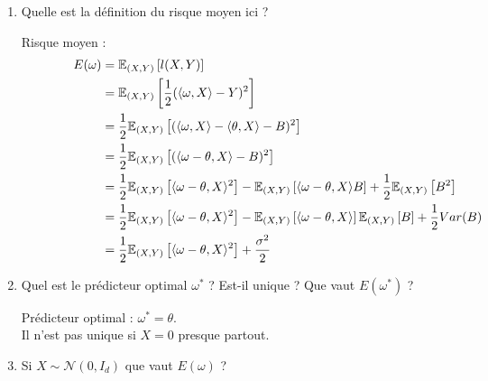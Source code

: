 \documentclass[12pt,a4paper]{article}
\begin{document}
\begin{enumerate}
    \color{black}
    \item Quelle est la définition du risque moyen ici ?
    
    \color{blue}
    Risque moyen :
    \begin{align*}
        E(\omega) &= \mathbb{E}_{(X, Y)} \left[l(X, Y)\right] \hspace{14.5cm}\\
        &= \mathbb{E}_{(X, Y)} \left[\frac{1}{2} (\langle \omega, X \rangle - Y)^2\right] \\
        &= \frac{1}{2} \mathbb{E}_{(X, Y)} \left[(\langle \omega, X \rangle - \langle \theta, X \rangle - B)^2\right] \\
        &= \frac{1}{2} \mathbb{E}_{(X, Y)} \left[(\langle \omega - \theta, X \rangle - B)^2\right] \\
        &= \frac{1}{2} \mathbb{E}_{(X, Y)} \left[\langle \omega - \theta, X \rangle ^2 \right]
        - \mathbb{E}_{(X, Y)} \left[\langle \omega - \theta, X \rangle B\right] 
        + \frac{1}{2} \mathbb{E}_{(X, Y)} \left[B^2\right] \\
        &= \frac{1}{2} \mathbb{E}_{(X, Y)} \left[\langle \omega - \theta, X \rangle ^2 \right]
        - \mathbb{E}_{(X, Y)} \left[\langle \omega - \theta, X \rangle \right] \mathbb{E}_{(X, Y)} \left[B\right]
        + \frac{1}{2} Var(B) \\
        &= \frac{1}{2} \mathbb{E}_{(X, Y)} \left[\langle \omega - \theta, X \rangle ^2 \right]
        + \frac{\sigma^2 }{2} \\
    \end{align*}
    

    \color{black}
    \item Quel est le prédicteur optimal $\omega^*$ ?
    Est-il unique ?
    Que vaut $E(\omega^*)$ ?

    \color{blue}
    Prédicteur optimal : $\omega^* = \theta$.\\
    Il n'est pas unique si $X = 0$ presque partout.\\

    \color{black}
    \item Si $X \sim \mathcal{N}(0, I_d)$ que vaut $E(\omega)$ ?
    

\end{enumerate}
\end{document}
